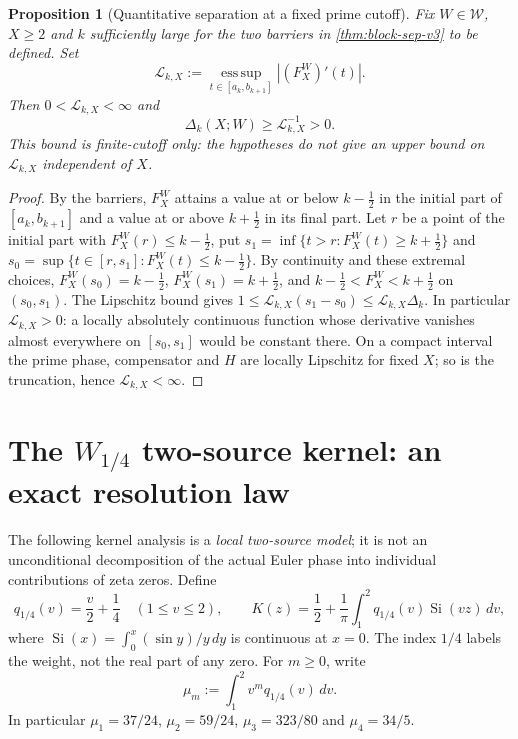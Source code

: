 \documentclass[11pt,a4paper]{article}
\numberwithin{equation}{section}
\newtheorem{proposition}[theorem]{Proposition}
\theoremstyle{definition}
\theoremstyle{remark}
\begin{document}
\begin{proposition}[Quantitative separation at a fixed prime cutoff]
\label{prop:Lipschitz-v4}
Fix $W\in\mathcal W$, $X\ge2$ and $k$ sufficiently large for the two barriers in
\cref{thm:block-sep-v3} to be defined. Set
\begin{equation}\label{eq:Mbound-v4}
 \mathscr L_{k,X}:=\operatorname*{ess\,sup}_{t\in[a_k,b_{k+1}]}
 |(F_X^W)'(t)|.
\end{equation}
Then $0<\mathscr L_{k,X}<\infty$ and
\begin{equation}\label{eq:Lipgap-v4}
 \boxed{\ \Delta_k(X;W)\ge\mathscr L_{k,X}^{-1}>0.\ }
\end{equation}
This bound is finite-cutoff only: the hypotheses do not give an
upper bound on $\mathscr L_{k,X}$ independent of $X$.
\end{proposition}
\begin{proof}
By the barriers, $F_X^W$ attains a value at or below
$k-\tfrac12$ in the initial part of $[a_k,b_{k+1}]$ and a value
at or above $k+\tfrac12$ in its final part. Let $r$ be a point of the
initial part with $F_X^W(r)\le k-\tfrac12$, put
$s_1=\inf\{t>r:F_X^W(t)\ge k+\tfrac12\}$ and
$s_0=\sup\{t\in[r,s_1]:F_X^W(t)\le k-\tfrac12\}$. By continuity and
these extremal choices, $F_X^W(s_0)=k-\tfrac12$,
$F_X^W(s_1)=k+\tfrac12$, and $k-\tfrac12<F_X^W<k+\tfrac12$ on
$(s_0,s_1)$. The Lipschitz bound gives
$1\le \mathscr L_{k,X}(s_1-s_0)\le\mathscr L_{k,X}\Delta_k$.
In particular $\mathscr L_{k,X}>0$: a locally absolutely continuous
function whose derivative vanishes almost everywhere on $[s_0,s_1]$
would be constant there.
On a compact interval the prime phase, compensator and $H$ are
locally Lipschitz for fixed $X$; so is the truncation, hence
$\mathscr L_{k,X}<\infty$.
\end{proof}

\section{The \texorpdfstring{$W_{1/4}$}{W/4} two-source kernel: an exact resolution law}
\label{sec:kernel-v4}
The following kernel analysis is a \emph{local two-source model};
it is not an unconditional decomposition of the actual Euler phase
into individual contributions of zeta zeros. Define
\begin{equation}\label{eq:q14-v4}
 q_{1/4}(v)=\frac v2+\frac14\quad (1\le v\le2),\qquad
 K(z)=\frac12+\frac1\pi\int_1^2q_{1/4}(v)
 \operatorname{Si}(vz)\,dv,
\end{equation}
where $\operatorname{Si}(x)=\int_0^x(\sin y)/y\,dy$ is continuous at
$x=0$. The index $1/4$ labels the weight, not the real part of any
zero. For $m\ge0$, write
\begin{equation}\label{eq:moments-v4}
 \mu_m:=\int_1^2v^m q_{1/4}(v)\,dv.
\end{equation}
In particular $\mu_1=37/24$, $\mu_2=59/24$,
$\mu_3=323/80$ and $\mu_4=34/5$.
\end{document}
